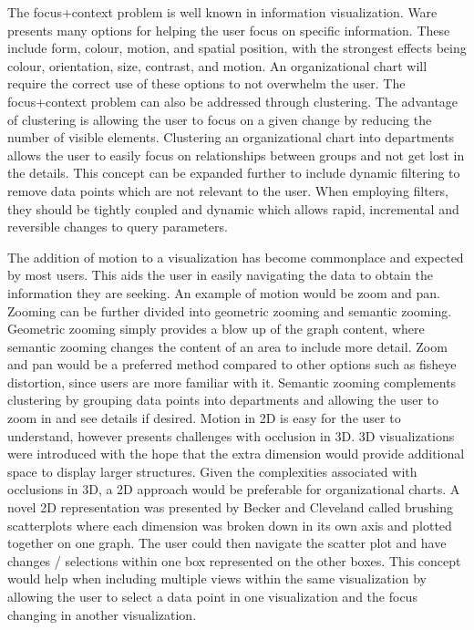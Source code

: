 \documentclass{soups}
\begin{document}
The focus+context problem is well known in information visualization.  Ware\cite{ware2012information} presents many options for helping the user focus on specific information.  These include form, colour, motion, and spatial position, with the strongest effects being colour, orientation, size, contrast, and motion\cite[chapter 5]{ware2012information}.  An organizational chart will require the correct use of these options to not overwhelm the user.  The focus+context problem can also be addressed through clustering.  The advantage of clustering is allowing the user to focus on a given change by reducing the number of visible elements\cite{herman2000graph}.  Clustering an organizational chart into departments allows the user to easily focus on relationships between groups and not get lost in the details.  This concept can be expanded further to include dynamic filtering to remove data points which are not relevant to the user.  When employing filters, they should be tightly coupled and dynamic which allows rapid, incremental and reversible changes to query parameters\cite{ahlberg1994visual}.

The addition of motion to a visualization has become commonplace and expected by most users.  This aids the user in easily navigating the data to obtain the information they are seeking.  An example of motion would be zoom and pan.  Zooming can be further divided into geometric zooming and semantic zooming.  Geometric zooming simply provides a blow up of the graph content, where semantic zooming changes the content of an area to include more detail\cite{herman2000graph}.  Zoom and pan would be a preferred method compared to other options such as fisheye distortion, since users are more familiar with it.  Semantic zooming complements clustering by grouping data points into departments and allowing the user to zoom in and see details if desired.  Motion in 2D is easy for the user to understand, however presents challenges with occlusion in 3D.  3D visualizations were introduced with the hope that the extra dimension would provide additional space to display larger structures\cite{herman2000graph}.  Given the complexities associated with occlusions in 3D, a 2D approach would be preferable for organizational charts.  A novel 2D representation was presented by Becker and Cleveland called brushing scatterplots where each dimension was broken down in its own axis and plotted together on one graph\cite{becker1987brushing}.  The user could then navigate the scatter plot and have changes / selections within one box represented on the other boxes.  This concept would help when including multiple views within the same visualization by allowing the user to select a data point in one visualization and the focus changing in another visualization.
\end{document}
